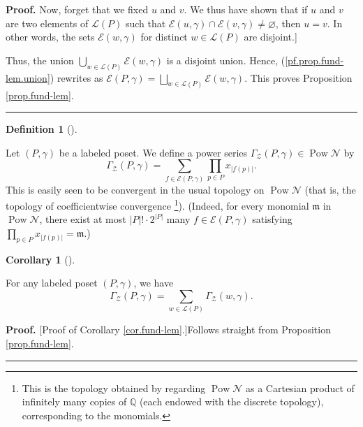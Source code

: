 \documentclass[numbers=enddot,12pt,final,onecolumn,notitlepage]{scrartcl}%
\theoremstyle{definition}
\newtheorem{defi}[theo]{Definition}
\newenvironment{definition}[1][]
{\begin{defi}[#1]\begin{leftbar}}
{\end{leftbar}\end{defi}}
\newtheorem{coro}[theo]{Corollary}
\newenvironment{corollary}[1][]
{\begin{coro}[#1]\begin{leftbar}}
{\end{leftbar}\end{coro}}
\newenvironment{proof}[1][Proof]{\noindent\textbf{#1.} }{\ \rule{0.5em}{0.5em}}
\newenvironment{verlong}{}{}
\let\sumnonlimits\sum
\let\prodnonlimits\prod
\renewcommand{\sum}{\sumnonlimits\limits}
\renewcommand{\prod}{\prodnonlimits\limits}
\begin{document}
\begin{verlong}
\begin{proof}
Now, forget that we fixed $u$ and $v$. We thus have shown that if $u$  and $v$
are two elements of $\mathcal{L}\left(  P\right)  $ such that $\mathcal{E}%
\left(  u,\gamma\right)  \cap\mathcal{E}\left(  v,\gamma\right)
\neq\varnothing$, then $u=v$. In other words, the sets $\mathcal{E}\left(
w,\gamma\right)  $ for distinct $w\in\mathcal{L}\left(  P\right)  $ are disjoint.]

Thus, the union $\bigcup_{w\in\mathcal{L}\left(  P\right)  }\mathcal{E}\left(
w,\gamma\right)  $ is a disjoint union. Hence, (\ref{pf.prop.fund-lem.union})
rewrites as $\mathcal{E}\left(  P,\gamma\right)  =\bigsqcup_{w\in
\mathcal{L}\left(  P\right)  }\mathcal{E}\left(  w,\gamma\right)  $. This
proves Proposition \ref{prop.fund-lem}.
\end{proof}
\end{verlong}

\begin{definition}
\label{def.GammaZ}Let $\left(  P,\gamma\right)  $ be a labeled poset. We
define a power series $\Gamma_{\mathcal{Z}}\left(  P,\gamma\right)
\in\operatorname*{Pow}\mathcal{N}$ by%
\[
\Gamma_{\mathcal{Z}}\left(  P,\gamma\right)  =\sum_{f\in\mathcal{E}\left(
P,\gamma\right)  }\prod_{p\in P}x_{\left\vert f\left(  p\right)  \right\vert
}.
\]
This is easily seen to be convergent in the usual topology on
$\operatorname*{Pow}\mathcal{N}$
(that is, the topology of coefficientwise convergence%
\footnote{This is the topology obtained by regarding
$\operatorname*{Pow}\mathcal{N}$ as a Cartesian product of
infinitely many copies of $\mathbb{Q}$ (each endowed with the
discrete topology), corresponding to the monomials.}).
(Indeed, for every monomial $\mathfrak{m}$ in $\operatorname*{Pow}\mathcal{N}$,
there exist at most $\left|P\right|! \cdot 2^{\left|P\right|}$ many
$f \in \mathcal{E} \left(P, \gamma\right)$ satisfying
$\prod_{p\in P}x_{\left\vert f\left(  p\right)  \right\vert } = \mathfrak{m}$.)
\end{definition}

\begin{corollary}
\label{cor.fund-lem}For any labeled poset $\left(  P,\gamma\right)  $, we have%
\[
\Gamma_{\mathcal{Z}}\left(  P,\gamma\right)  =\sum_{w\in\mathcal{L}\left(
P\right)  }\Gamma_{\mathcal{Z}}\left(  w,\gamma\right)  .
\]

\end{corollary}

\begin{proof}
[Proof of Corollary \ref{cor.fund-lem}.]Follows straight from Proposition
\ref{prop.fund-lem}.
\end{proof}
\end{document}
